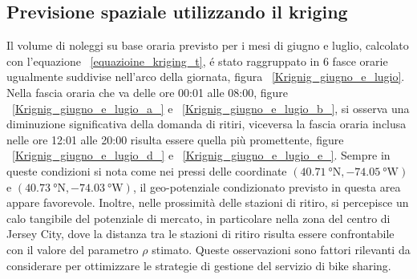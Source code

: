 \subsection{Previsione spaziale utilizzando il kriging}
Il volume di noleggi su base oraria previsto per i mesi di giugno e luglio, calcolato con l'equazione ~\ref{equazioine_kriging_t}, é stato raggruppato in 6 fasce orarie ugualmente suddivise nell'arco della giornata, figura  ~\ref{Krignig_giugno_e_lugio}. Nella fascia oraria che va delle ore 00:01 alle 08:00, figure ~\ref{Krignig_giugno_e_lugio_a_} e ~\ref{Krignig_giugno_e_lugio_b_}, si osserva una diminuzione significativa della domanda di ritiri, viceversa la fascia oraria inclusa nelle ore 12:01 alle 20:00 risulta essere quella più promettente, figure ~\ref{Krignig_giugno_e_lugio_d_} e ~\ref{Krignig_giugno_e_lugio_e_}. Sempre in queste condizioni si nota come nei pressi delle coordinate $(\SI{40.71}{\degree} \text{N}, \SI{-74.05}{\degree} \text{W})$ e $(\SI{40.73}{\degree} \text{N}, \SI{-74.03}{\degree} \text{W})$, il geo-potenziale condizionato previsto in questa area appare favorevole. Inoltre, nelle prossimità delle stazioni di ritiro, si percepisce un calo tangibile del potenziale di mercato, in particolare nella zona del centro di Jersey City, dove la distanza tra le stazioni di ritiro risulta essere confrontabile con il valore del parametro $\rho$ stimato. Queste osservazioni sono fattori rilevanti da considerare per ottimizzare le strategie di gestione del servizio di bike sharing.
